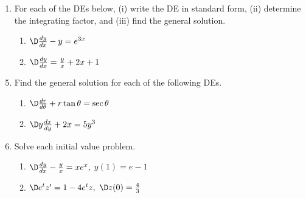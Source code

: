 \documentclass[12pt]{amsart}
\numberwithin{equation}{section}
\begin{document}

\begin{enumerate}[1.]
\setcounter{enumi}{0}
\item  For each of the DEs below, (i) write the DE in standard form, (ii) determine the integrating factor, and (iii) find the general solution.
	\begin{enumerate}
	\item  $\D \frac{dy}{dx} - y = e^{3x}$\\

\newpage
\thispagestyle{empty}

	\item  $\D \frac{dy}{dx} = \frac{y}{x} + 2x + 1$\\
	\end{enumerate}
\end{enumerate}

\newpage
\thispagestyle{empty}

\begin{enumerate}[1.]
\setcounter{enumi}{4}
\item  Find the general solution for each of the following DEs.
	\begin{enumerate}
	\item  $\D \frac{dr}{d\theta} + r\tan \theta = \sec \theta$\\

\newpage
\thispagestyle{empty}

	\item  $\D y\frac{dx}{dy} + 2x = 5y^3$\\
	\end{enumerate}
\end{enumerate}

\newpage
\thispagestyle{empty}

\begin{enumerate}[1.]
\setcounter{enumi}{5}
\item    Solve each initial value problem.
	\begin{enumerate}
	\item  $\D \frac{dy}{dx} - \frac{y}{x} = xe^x,$ \hspace{0.5cm} $y(1) = e-1$\\

\newpage
\thispagestyle{empty}

	\item  $\D  e^t z' = 1 - 4e^t z,$ \hspace{0.5cm} $\D z(0) = \frac{4}{3}$\\
	\end{enumerate}
\end{enumerate}
\end{document}
